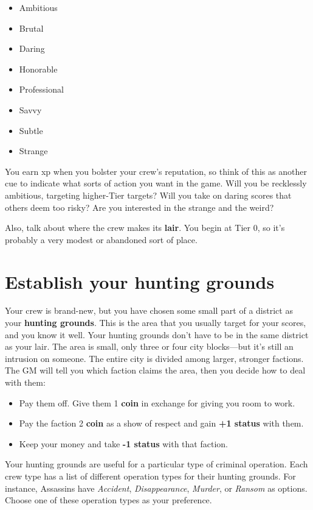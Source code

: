\documentclass[11pt,oneside]{book}
\newcommand{\gameterm}[1]{\textbf{#1}}
\begin{document}
\begin{itemize}
	\item Ambitious
	\item Brutal
	\item Daring
	\item Honorable
	\item Professional
	\item Savvy
	\item Subtle
	\item Strange
\end{itemize}

You earn xp when you bolster your crew’s reputation, so think of this as another cue to indicate what sorts of action you want in the game. Will you be recklessly ambitious, targeting higher-Tier targets? Will you take on daring scores that others deem too risky? Are you interested in the strange and the weird?

Also, talk about where the crew makes its \textbf{lair}. You begin at Tier 0, so it’s probably a very modest or abandoned sort of place.

\section{Establish your hunting grounds}

Your crew is brand-new, but you have chosen some small part of a district as your \textbf{hunting grounds}. This is the area that you usually target for your scores, and you know it well. Your hunting grounds don’t have to be in the same district as your lair. The area is small, only three or four city blocks---but it’s still an intrusion on someone. The entire city is divided among larger, stronger factions. The GM will tell you which faction claims the area, then you decide how to deal with them:

\begin{itemize}
	\item Pay them off. Give them 1 \gameterm{coin}  in exchange for giving you room to work.
	\item Pay the faction 2 \gameterm{coin}  as a show of respect and gain \textbf{+1 status }with them.
	\item Keep your money and take \textbf{-1 status} with that faction.
\end{itemize}

Your hunting grounds are useful for a particular type of criminal operation. Each crew type has a list of different operation types for their hunting grounds. For instance, Assassins have \emph{Accident}, \emph{Disappearance}, \emph{Murder}, or \emph{Ransom} as options. Choose one of these operation types as your preference.
\end{document}
